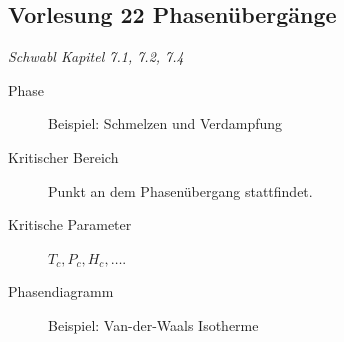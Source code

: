 \subsection*{Vorlesung 22 Phasenübergänge}
\emph{Schwabl Kapitel 7.1, 7.2, 7.4} \\

\begin{description}
  \item[Phase] Beispiel: Schmelzen und Verdampfung
  \item[Kritischer Bereich] Punkt an dem Phasenübergang stattfindet.
  \item[Kritische Parameter] $T_c, P_c, H_c, \ldots $.
  \item[Phasendiagramm] Beispiel: Van-der-Waals Isotherme

\end{description}
